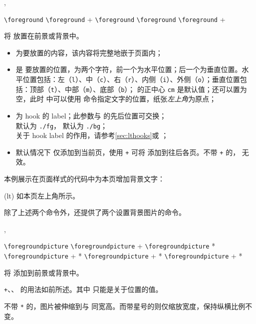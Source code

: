 \documentclass{cusdoc}
\begin{document}
\begin{function}{\foreground,\background}
  \begin{syntax}
    \verb|\foreground|   
    \verb|\foreground| + 
    \verb|\foreground|  
    \verb|\foreground|  
    \verb|\foreground| +   
  \end{syntax}
将  放置在前景或背景中。

\begin{itemize}[nosep]
  \item {} 为要放置的内容，该内容将完整地嵌于页面内；
  \item {} 是  要放置的位置，为两个字符，前一个为水平位置；后一个为垂直位置。水平位置包括：左（\texttt{l}）、中（\texttt{c}）、右（\texttt{r}）、内侧（\texttt{i}）、外侧（\texttt{o}）；垂直位置包括：顶部（\texttt{t}）、中部（\texttt{m}）、底部（\texttt{b}）； 的正中心 \texttt{cm} 是默认值；还可以置为空，此时  中可以使用  命令指定文字的位置，纸张\emph{左上角}为原点；
  \item {} 为 hook 的 label；此参数与  的先后位置可交换；\\ 
   默认为 \texttt{./fg}， 默认为 \texttt{./bg}；\\
  关于 hook label 的作用，请参考\cref{sec:lthooks}或 ；
  \item 默认情况下  仅添加到当前页，使用 \texttt{+} 可将  添加到往后各页。不带 \texttt+ 的， 无效。
\end{itemize}
\end{function}

本例展示在页面样式的代码中为本页增加背景文字：
\needspace{3cm}
\begin{xample}
\background(lt){\textcolor{red}{\LARGE\CusTeX}}
\stopxamplecode
\xampleprint
如本页左上角所示。
\end{xample}

除了上述两个命令外，还提供了两个设置背景图片的命令。

\begin{function}{\foregroundpicture,\backgroundpicture}
  \begin{syntax}
    \verb|\foregroundpicture|     
    \verb|\foregroundpicture| +   
    \verb|\foregroundpicture|   * 
    \verb|\foregroundpicture| + * 
    \verb|\foregroundpicture| + *    
    \verb|\foregroundpicture| + *    
  \end{syntax}
将  添加到前景或背景中。

\texttt{+}、、 的用法如前所述。其中  只能是关于位置的值。

不带 \verb|*| 的，图片被伸缩到与  同宽高。而带星号的则仅缩放宽度，保持纵横比例不变。
\end{function}
\end{document}
